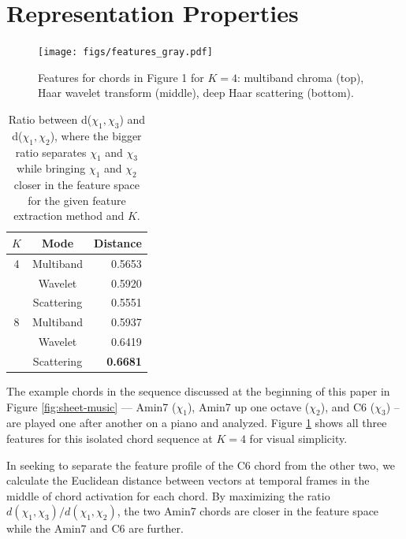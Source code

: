 \documentclass{article}
\begin{document}
\section{Representation Properties}

\begin{figure}
	\begin{center}
	\texttt{[image: figs/features\_gray.pdf]}
	\end{center}
\caption{Features for chords in Figure 1 for $K=4$: multiband chroma (top), Haar wavelet transform (middle), deep Haar scattering (bottom).}
\label{fig:features}
\end{figure}

\begin{table}
	\begin{center}
	\begin{tabular} {| c | c | r |}
	\hline
	$K$ & Mode & Distance \\
	\hline
	4 & Multiband & 0.5653 \\
	& Wavelet & 0.5920 \\
	& Scattering & 0.5551 \\
	\hline
	8 & Multiband & 0.5937 \\
	& Wavelet & 0.6419 \\
	& Scattering & \textbf{0.6681} \\

	\hline
	\end{tabular}
	\end{center}
	\protect\caption{Ratio between d($\chi_1,\chi_3$) and d($\chi_1,\chi_2$), where the bigger ratio separates $\chi_1$ and $\chi_3$ while bringing $\chi_1$ and $\chi_2$ closer in the feature space for the given feature extraction method and $K$.
	\label{table:distances}}
\end{table}

The example chords in the sequence discussed at the beginning of this paper in Figure \ref{fig:sheet-music} --- Amin7 ($\chi_1$), Amin7 up one octave ($\chi_2$), and C6 ($\chi_3$) --  are played one after another on a piano and analyzed. Figure \ref{fig:features} shows all three features for this isolated chord sequence at $K=4$ for visual simplicity. 

In seeking to separate the feature profile of the C6 chord from the other two, we calculate the Euclidean distance between vectors at temporal frames in the middle of chord activation for each chord. By maximizing the ratio $d(\chi_1,\chi_3)/d(\chi_1,\chi_2)$, the two Amin7 chords are closer in the feature space while the Amin7 and C6 are further.
\end{document}
